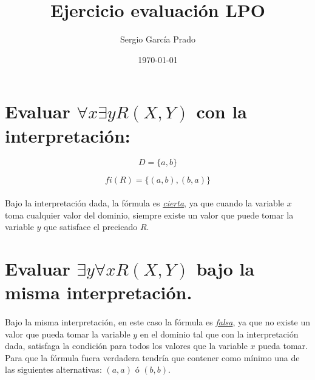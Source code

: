 \documentclass[10pt, a4paper,spanish]{article}
\title{\vspace{-15mm}\fontsize{24pt}{10pt}\selectfont\textbf{Ejercicio evaluación LPO}} %
\author{Sergio García Prado}
\date{\today}
\begin{document}
	\maketitle %

	\thispagestyle{fancy} %


	\section{Evaluar   $\forall x \exists y R(X,Y)$   con la interpretación:}

	    \begin{equation}
	        D=\{a, b\}
		\end{equation}

		\begin{equation}
	        fi(R)=\{(a, b), (b,a)\}
	    \end{equation}

	    \paragraph{}
		Bajo la interpretación dada, la fórmula es \underline{\emph{cierta}}, ya que cuando la variable $x$ toma cualquier valor del dominio, siempre existe un valor que puede tomar la variable $y$ que satisface el precicado $R$.

	\section{Evaluar  $\exists y \forall x R(X,Y)$  bajo la misma interpretación.}

		\paragraph{}
		Bajo la misma interpretación, en este caso la fórmula es \underline{\emph{falsa}}, ya que no existe un valor que pueda tomar la variable $y$ en el dominio tal que con la interpretación dada, satisfaga la condición para todos los valores que la variable $x$ pueda tomar. Para que la fórmula fuera verdadera tendría que contener como mínimo una de las siguientes alternativas: $(a,a)$ ó $(b,b)$.
\end{document}
